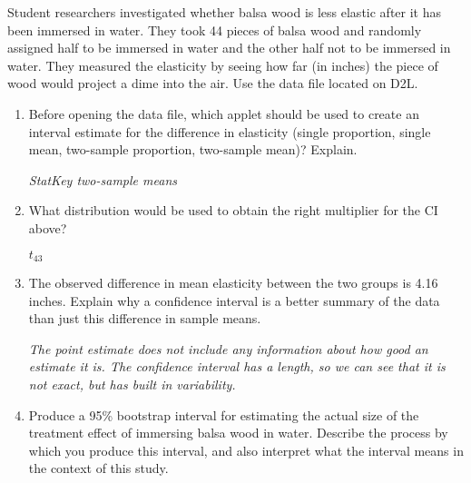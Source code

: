 \begin{enumerate}
     Student researchers investigated whether balsa wood is less
     elastic after it has been immersed in water.  They took 44 pieces
     of balsa wood and randomly assigned half to be immersed in water
     and the other half not to be immersed in water.  They measured
     the elasticity by seeing how far (in inches) the piece of wood
     would project a dime into the air. Use the data file located on
     D2L.
     \begin{enumerate}
     \item  Before opening the data file, which applet should be used
       to create an interval estimate for the difference in elasticity
       (single proportion, single mean, two-sample proportion,
       two-sample mean)?  Explain. 
\begin{students}
          \vspace{1.5cm}
\end{students}
\begin{key}
 {\it StatKey two-sample means }      
\end{key}
\item What distribution would be used to obtain the right multiplier
  for the CI above?
\begin{students}
          \vspace{1cm}
\end{students}
\begin{key}
 {\it $t_{43}$}      
\end{key}

     \item  The observed difference in mean elasticity between the two
       groups is 4.16 inches.  Explain why a confidence interval is a
       better summary of the data than just this difference in sample
       means. 
\begin{students}
\vspace{2cm}
\end{students}
\begin{key}
 {\it The point estimate does not include any information about how
   good an estimate it is.  The confidence interval has a length, so
   we can see that it is not exact, but has built in variability. }
\end{key}
     \item  Produce a 95\% bootstrap interval for estimating the
       actual size of the treatment effect of immersing balsa wood in
       water.  Describe the process by which you produce this
       interval, and also interpret what the interval means in the
       context of this study. 
\begin{students}
       \newpage
\end{students}
\begin{key}
 {\it  }      
\end{key}
     \end{enumerate}
   



\end{enumerate}
